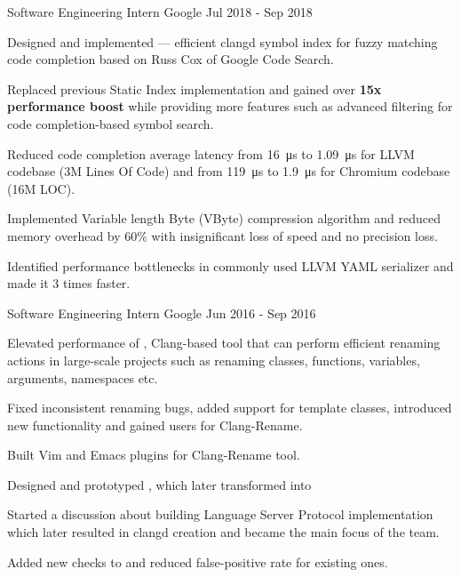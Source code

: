 \begin{cventries}
  \cventry
    {Software Engineering Intern}
    {Google}
    {}
    {Jul 2018 - Sep 2018}
    {
      \begin{cvitems}
        \item Designed and implemented
          --- efficient clangd symbol index for fuzzy matching code completion
          based on Russ Cox
           of Google
          Code Search.
        \item Replaced previous Static Index implementation and gained over
          \textbf{15x performance boost} while providing more features such as
          advanced filtering for code completion-based symbol search.
        \item Reduced code completion average latency from \SI{16}{\us} to
          \SI{1.09}{\us} for LLVM codebase (3M Lines Of Code) and from
          \SI{119}{\us} to \SI{1.9}{\us} for Chromium codebase (16M LOC).
        \item Implemented Variable length Byte (VByte) compression algorithm
          and reduced memory overhead by 60\% with insignificant loss of
          speed and no precision loss.
        \item Identified performance bottlenecks in commonly used LLVM YAML
          serializer and made it 3 times faster.
      \end{cvitems}
    }

  \cventry
    {Software Engineering Intern}
    {Google}
    {}
    {Jun 2016 - Sep 2016}
    {
      \begin{cvitems}
        \item Elevated performance of
        ,
          Clang-based tool that can perform efficient renaming actions in
          large-scale projects such as renaming classes, functions,
          variables, arguments, namespaces etc.
        \item Fixed inconsistent renaming bugs, added support for template
          classes, introduced new functionality and gained users for
          Clang-Rename.
        \item Built Vim and Emacs plugins for Clang-Rename tool.
        \item Designed and prototyped
          ,
          which later transformed into
        \item Started a discussion about building Language Server Protocol
          implementation which later resulted in clangd creation and became the
          main focus of the team.
        \item Added new checks to
           and
          reduced false-positive rate for existing ones.
      \end{cvitems}
    }


\end{cventries}
